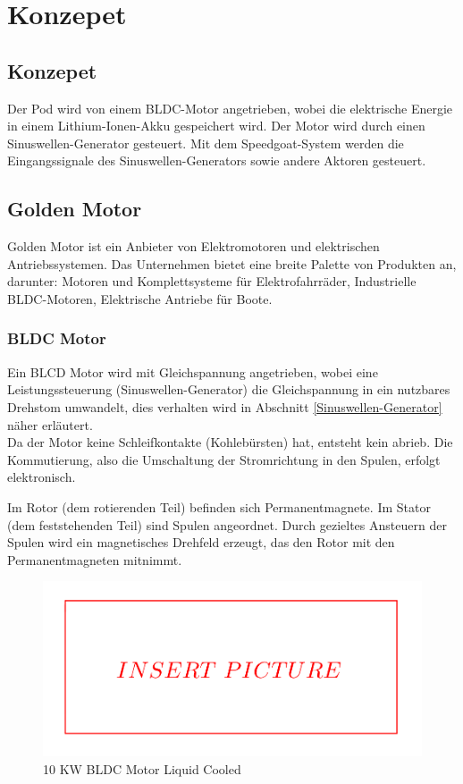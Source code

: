 \chapter{Konzepet}

\section{Konzepet}
Der Pod wird von einem BLDC-Motor angetrieben, wobei die elektrische Energie in einem Lithium-Ionen-Akku gespeichert wird. Der Motor wird durch einen Sinuswellen-Generator gesteuert. Mit dem Speedgoat-System werden die Eingangssignale des Sinuswellen-Generators sowie andere Aktoren gesteuert.

\section{Golden Motor}
\label{Golden_Motor}
Golden Motor ist ein Anbieter von Elektromotoren und elektrischen Antriebssystemen. Das Unternehmen bietet eine breite Palette von Produkten an, darunter:
Motoren und Komplettsysteme für Elektrofahrräder, Industrielle BLDC-Motoren, Elektrische Antriebe für Boote.


\subsection{BLDC Motor}
\label{BLDC_Motor}
Ein BLCD Motor wird mit Gleichspannung angetrieben, wobei eine Leistungssteuerung (Sinuswellen-Generator) die Gleichspannung in ein nutzbares Drehstom umwandelt, dies verhalten wird in Abschnitt \ref{Sinuswellen-Generator} näher erläutert.\\

Da der Motor keine Schleifkontakte (Kohlebürsten) hat, entsteht kein abrieb. Die Kommutierung, also die Umschaltung der Stromrichtung in den Spulen, erfolgt elektronisch.

Im Rotor (dem rotierenden Teil) befinden sich Permanentmagnete. Im Stator (dem feststehenden Teil) sind Spulen angeordnet. Durch gezieltes Ansteuern der Spulen wird ein magnetisches Drehfeld erzeugt, das den Rotor mit den Permanentmagneten mitnimmt.

\begin{figure}[!ht]
	\begin{center}
		\includegraphics[width=\textwidth]{img/2_imp/insert_pic.png}
		\caption{10 KW BLDC Motor Liquid Cooled}
		\label{img_2_2:motor}
	\end{center}
\end{figure}

